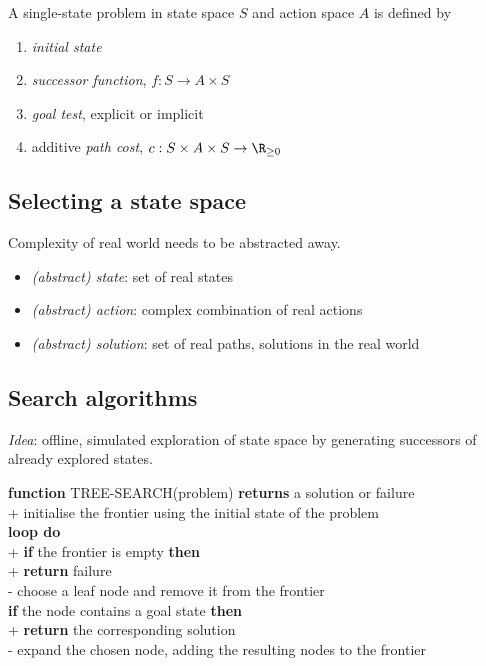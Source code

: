\documentclass{article}
\begin{document}
\begin{definition}
    A single-state problem in state space $S$
    and action space $A$ is defined by
    \begin{enumerate}
        \item \emph{initial state}
        \item \emph{successor function}, $f:S\to A\times S$
        \item \emph{goal test}, explicit or implicit
        \item additive \emph{path cost}, $c:S\times A\times S\to\R_{\geq 0}$
    \end{enumerate}
\end{definition}

\subsection{Selecting a state space}

Complexity of real world needs to be abstracted away.
\begin{itemize}
    \item \emph{(abstract) state}: set of real states
    \item \emph{(abstract) action}: complex combination of real actions
    \item \emph{(abstract) solution}: set of real paths, solutions in the real world
\end{itemize}

\subsection{Search algorithms}

\emph{Idea}: offline, simulated exploration of state space by generating successors of already
explored states.

\begin{pseudo}
    \textbf{function} TREE-SEARCH(problem) \textbf{returns} a solution or failure   \\+
    initialise the frontier using the initial state of the problem              \\
    \textbf{loop do}                                                            \\+
    \textbf{if} the frontier is empty \textbf{then}                          \\+
    \textbf{return} failure                                             \\-
    choose a leaf node and remove it from the frontier                      \\
    \textbf{if} the node contains a goal state \textbf{then}                \\+
    \textbf{return} the corresponding solution                          \\-
    expand the chosen node, adding the resulting nodes to the frontier
\end{pseudo}
\end{document}
